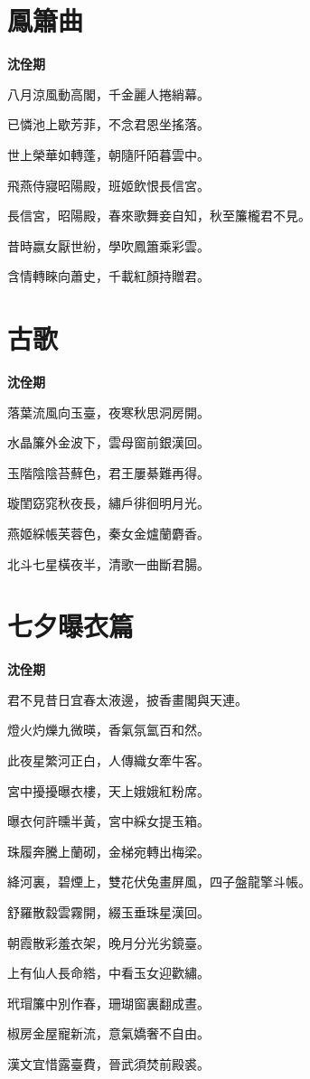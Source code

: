 \documentclass[12pt,a4paper]{ctexbook}
\begin{document}
\section{鳳簫曲}
\textbf{沈佺期}\par\vspace{0.5em}
八月涼風動高閣，千金麗人捲綃幕。\par
已憐池上歇芳菲，不念君恩坐搖落。\par
世上榮華如轉蓬，朝隨阡陌暮雲中。\par
飛燕侍寢昭陽殿，班姬飲恨長信宮。\par
長信宮，昭陽殿，春來歌舞妾自知，秋至簾櫳君不見。\par
昔時嬴女厭世紛，學吹鳳簫乘彩雲。\par
含情轉睞向蕭史，千載紅顏持贈君。\par

\section{古歌}
\textbf{沈佺期}\par\vspace{0.5em}
落葉流風向玉臺，夜寒秋思洞房開。\par
水晶簾外金波下，雲母窗前銀漢回。\par
玉階陰陰苔蘚色，君王屢綦難再得。\par
璇閨窈窕秋夜長，繡戶徘徊明月光。\par
燕姬綵帳芙蓉色，秦女金爐蘭麝香。\par
北斗七星橫夜半，清歌一曲斷君腸。\par

\section{七夕曝衣篇}
\textbf{沈佺期}\par\vspace{0.5em}
君不見昔日宜春太液邊，披香畫閣與天連。\par
燈火灼爍九微暎，香氣氛氳百和然。\par
此夜星繁河正白，人傳織女牽牛客。\par
宮中擾擾曝衣樓，天上娥娥紅粉席。\par
曝衣何許曛半黃，宮中綵女提玉箱。\par
珠履奔騰上蘭砌，金梯宛轉出梅梁。\par
絳河裏，碧煙上，雙花伏兔畫屏風，四子盤龍擎斗帳。\par
舒羅散縠雲霧開，綴玉垂珠星漢回。\par
朝霞散彩羞衣架，晚月分光劣鏡臺。\par
上有仙人長命綹，中看玉女迎歡繡。\par
玳瑁簾中別作春，珊瑚窗裏翻成晝。\par
椒房金屋寵新流，意氣嬌奢不自由。\par
漢文宜惜露臺費，晉武須焚前殿裘。\par
\end{document}
